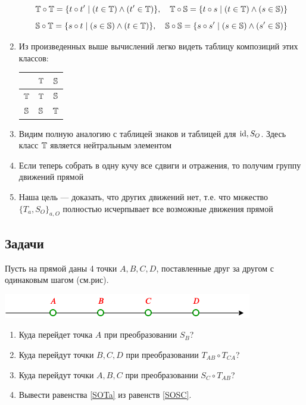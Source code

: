 \begin{enumerate}
$$
\T\circ \T = \{t\circ t'\mid (t\in\T)\land(t'\in\T)\},\quad \T\circ \S = \{t\circ s\mid (t\in\T)\land(s\in\S)\}
$$
$$
\S\circ \T = \{s\circ t\mid (s\in\S)\land(t\in\T)\},\quad \S\circ \S = \{s\circ s'\mid (s\in\S)\land(s'\in\S)\}
$$
\item Из произведенных выше вычислений легко видеть таблицу композиций этих классов:
\begin{center}
\begin{tabular}{c|c|c|}
  & $\T$ & $\S$ \\
 \hline
$\T$ & $\T$ & $\S$ \\
 \hline
$\S$ & $\S$ & $\T$ \\
\hline
\end{tabular}
\end{center}
\item Видим полную аналогию с таблицей знаков и таблицей для $\id, S_O$. Здесь класс $\T$ является нейтральным элементом
\item Если теперь собрать в одну кучу все сдвиги и отражения, то получим группу движений прямой
\item Наша цель --- доказать, что других движений нет, т.е. что мнжество $\{T_a,S_O\}_{a,O}$ полностью исчерпывает все возможные движения прямой
\end{enumerate}

\subsection*{Задачи}

Пусть на прямой даны 4 точки $A,B,C,D$, поставленные друг за другом с одинаковым шагом (см.рис).
\begin{center}
\includegraphics[scale=0.7]{ABCD.png}
\end{center}

\begin{enumerate}
\item Куда перейдет точка $A$ при преобразовании $S_B$?
\item Куда перейдут точки $B,C,D$ при преобразовании $T_{AB}\circ T_{CA}$?
\item Куда перейдут точки $A,B,C$ при преобразовании $S_C\circ T_{AB}$?
\item Вывести равенства \eqref{SOTa} из равенств \eqref{SOSC}.
\end{enumerate}



